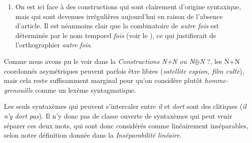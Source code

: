 {\begin{enumerate}[label=\alph*.]
    \item On est ici face à des constructions qui sont clairement d’origine syntaxique, mais qui sont devenues irrégulières aujourd’hui en raison de l’absence d’article. Il est néanmoins clair que la combinatoire de \textit{autre fois} est déterminée par le nom temporel \textit{fois} (voir le ), ce qui justifierait de l’orthographier \textit{autre fois}.
    \end{enumerate}

     Comme nous avons pu le voir dans la  \textit{Constructions N+N ou N}\textrm{\textit{${\oplus}$}}\textit{N} ?, les N+N coordonnés asymétriques peuvent parfois être libres (\textit{satellite espion, film culte}), mais cela reste suffisamment marginal pour qu’on considère plutôt \textit{homme-grenouille} comme un lexème syntagmatique.

     Les seuls syntaxèmes qui peuvent s’intercaler entre \textit{il} et \textit{dort} sont des clitiques (\textit{il n’y dort pas}). Il n’y donc pas de classe ouverte de syntaxèmes qui peut venir séparer ces deux mots, qui sont donc considérés comme linéairement inséparables, selon notre définition donnée dans la  \textit{Inséparabilité linéaire}.
}
